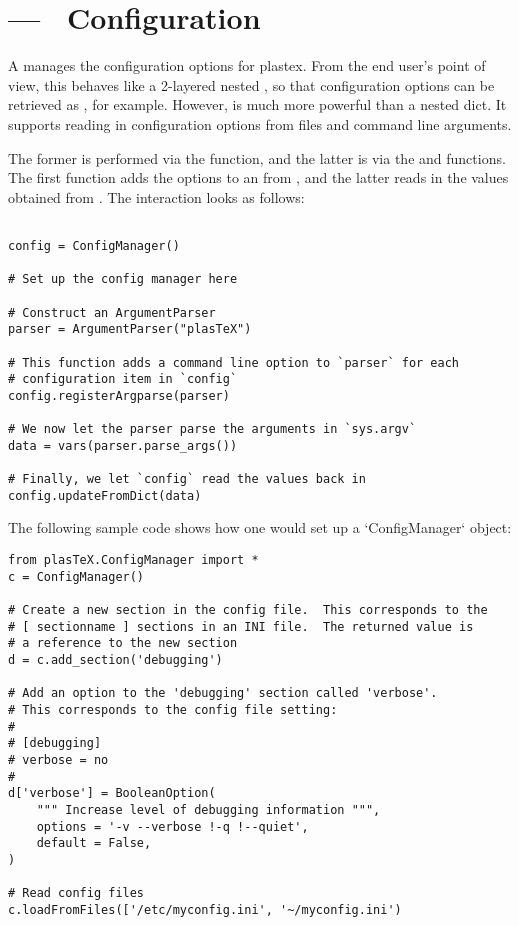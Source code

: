 
\section{ --- \plasTeX\ Configuration}
\label{sec:configuration-api}


A  manages the configuration options for plastex. From the
end user's point of view, this behaves like a 2-layered nested , so
that configuration options can be retrieved as
, for example. However,  is
much more powerful than a nested dict. It supports reading in configuration
options from  files and command line arguments.

The former is performed via the  function, and the latter is via
the  and  functions. The first
function adds the options to an  from ,
and the latter reads in the values obtained from . The
interaction looks as follows:

\begin{verbatim}

config = ConfigManager()

# Set up the config manager here

# Construct an ArgumentParser
parser = ArgumentParser("plasTeX")

# This function adds a command line option to `parser` for each
# configuration item in `config`
config.registerArgparse(parser)

# We now let the parser parse the arguments in `sys.argv`
data = vars(parser.parse_args())

# Finally, we let `config` read the values back in
config.updateFromDict(data)

\end{verbatim}

The following sample code shows how one would set up a `ConfigManager` object:

\begin{verbatim}
from plasTeX.ConfigManager import *
c = ConfigManager()

# Create a new section in the config file.  This corresponds to the
# [ sectionname ] sections in an INI file.  The returned value is 
# a reference to the new section
d = c.add_section('debugging')

# Add an option to the 'debugging' section called 'verbose'.
# This corresponds to the config file setting:
#
# [debugging]
# verbose = no
#
d['verbose'] = BooleanOption(
    """ Increase level of debugging information """,
    options = '-v --verbose !-q !--quiet',
    default = False,
)

# Read config files
c.loadFromFiles(['/etc/myconfig.ini', '~/myconfig.ini')
\end{verbatim}

